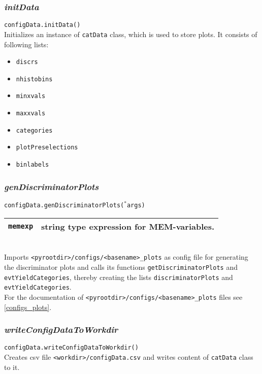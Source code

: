 \documentclass[12pt, a4paper]{article}
\newcommand{\args}{$^*$args}
\begin{document}
\subsubsection{\textit{initData}}
\label{catData}
\texttt{configData.initData()}\\
Initializes an instance of \texttt{catData} class, which is used to store plots.
It consists of following lists:
\begin{small}
\begin{itemize}
\itemsep-0.7em
\item \texttt{discrs}
\item \texttt{nhistobins}
\item \texttt{minxvals}
\item \texttt{maxxvals}
\item \texttt{categories}
\item \texttt{plotPreselections}
\item \texttt{binlabels}
\end{itemize}
\end{small}


\subsubsection{\textit{genDiscriminatorPlots}}
\texttt{configData.genDiscriminatorPlots(\args)}\\
\begin{tabular}{r|l}
\hline
\texttt{memexp} 	& string type expression for MEM-variables.\\
\hline
\end{tabular}
\\
Imports \texttt{<pyrootdir>/configs/<basename>\_plots} as config file for generating the discriminator plots and calls its functions \texttt{getDiscriminatorPlots} and \texttt{evtYieldCategories}, thereby creating the lists \texttt{discriminatorPlots} and \texttt{evtYieldCategories}.\\
For the documentation of \texttt{<pyrootdir>/configs/<basename>\_plots} files see \ref{configs_plots}.

\subsubsection{\textit{writeConfigDataToWorkdir}}
\texttt{configData.writeConfigDataToWorkdir()}\\
Creates csv file \texttt{<workdir>/configData.csv} and writes content of \texttt{catData} class to it.
\end{document}
